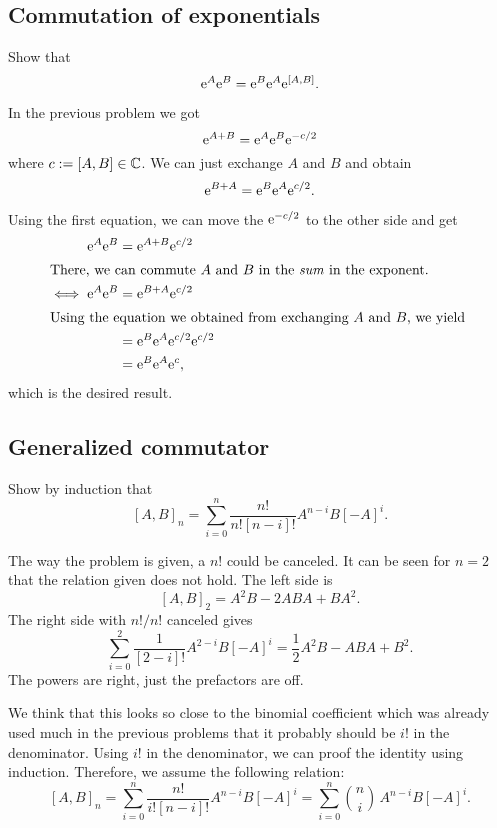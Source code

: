 \documentclass[11pt, english, fleqn, DIV=15, headinclude, BCOR=1.5cm]{scrartcl}
\begin{document}
\subsection{Commutation of exponentials}

\begin{problem}
    Show that
    \[
        \mathrm e^A \mathrm e^B = \mathrm e^B \mathrm e^A \mathrm e^{[A,B]}.
    \]
\end{problem}

In the previous problem we got
\[
    \mathrm e^{A + B} = \mathrm e^A \mathrm e^B \mathrm e^{-c/2}
\]
where $c := [A, B] \in \mathbb C$. We can just exchange $A$ and $B$ and obtain
\[
    \mathrm e^{B + A} = \mathrm e^B \mathrm e^A \mathrm e^{c/2}.
\]

Using the first equation, we can move the $\mathrm e^{-c/2}$ to the other side and
get
\begin{align*}
    \eup^A \eup^B &= \eup^{A + B} \eup^{c/2} \\
    \intertext{%
        There, we can commute $A$ and $B$ in the \emph{sum} in the exponent.
    }
    \iff \eup^A \eup^B &= \eup^{B + A} \eup^{c/2} \\
    \intertext{%
        Using the equation we obtained from exchanging $A$ and $B$, we yield
    }
    &= \eup^B \eup^A \eup^{c/2} \eup^{c/2} \\
    &= \eup^B \eup^A \eup^{c},
\end{align*}
which is the desired result.

\subsection{Generalized commutator}

\begin{problem}
    Show by induction that
    \[
        [A, B]_n = \sum_{i=0}^n \frac{n!}{n![n-i]!} A^{n-i} B [-A]^i.
    \]
\end{problem}

The way the problem is given, a $n!$ could be canceled. It can be seen for $n =
2$ that the relation given does not hold. The left side is
\[
    [A, B]_2 = A^2 B - 2 ABA + BA^2.
\]
The right side with $n!/n!$ canceled gives
\[
    \sum_{i=0}^2 \frac{1}{[2-i]!} A^{2-i} B [-A]^i
    = \frac12 A^2 B - ABA + B^2.
\]
The powers are right, just the prefactors are off.

We think that this looks so close to the binomial coefficient which was already
used much in the previous problems that it probably should be $i!$ in the
denominator. Using $i!$ in the denominator, we can proof the identity using
induction. Therefore, we assume the following relation:
\[
    [A, B]_n
    = \sum_{i=0}^n \frac{n!}{i![n-i]!} A^{n-i} B [-A]^i
    = \sum_{i=0}^n \binom ni \, A^{n-i} B [-A]^i.
\]
\end{document}
